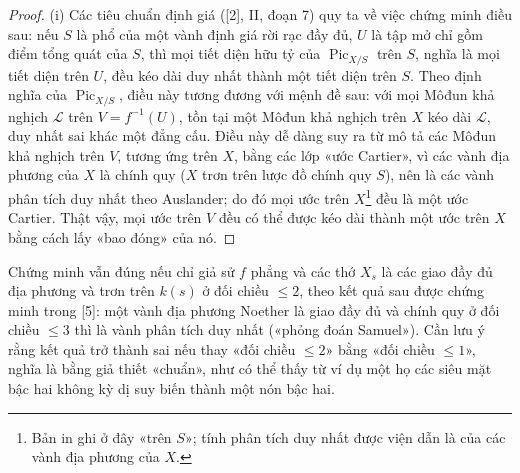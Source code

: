 \begin{proof}
(i) Các tiêu chuẩn định giá ([2], II, đoạn 7) quy ta về việc chứng minh điều
sau: nếu $S$ là phổ của một vành định giá rời rạc đầy đủ, $U$ là tập mở chỉ
gồm điểm tổng quát của $S$, thì mọi tiết diện hữu tỷ của
$\operatorname{Pic}_{X/S}$ trên $S$, nghĩa là mọi tiết diện trên $U$, đều kéo
dài duy nhất thành một tiết diện trên $S$. Theo định nghĩa của
$\operatorname{Pic}_{X/S}$, điều này tương đương với mệnh đề sau: với mọi
Môđun khả nghịch $\mathcal L$ trên $V=f^{-1}(U)$, tồn tại một Môđun khả nghịch
trên $X$ kéo dài $\mathcal L$, duy nhất sai khác một đẳng cấu. Điều này dễ dàng
suy ra từ mô tả các Môđun khả nghịch trên $V$, tương ứng trên $X$, bằng các
lớp «ước Cartier», vì các vành địa phương của $X$ là chính quy ($X$ trơn trên
lược đồ chính quy $S$), nên là các vành phân tích duy nhất theo Auslander; do
đó mọi ước trên $X$\footnote{Bản in ghi ở đây «trên $S$»; tính phân tích duy
nhất được viện dẫn là của các vành địa phương của $X$.} đều là một ước
Cartier. Thật vậy, mọi ước trên $V$ đều có thể được kéo dài thành một ước trên
$X$ bằng cách lấy «bao đóng» của nó.
\end{proof}

 Chứng minh vẫn đúng nếu chỉ giả sử $f$ phẳng và các thớ
$X_s$ là các giao đầy đủ địa phương và trơn trên $k(s)$ ở đối chiều $\leq2$,
theo kết quả sau được chứng minh trong [5]: một vành địa phương Noether là giao
đầy đủ và chính quy ở đối chiều $\leq3$ thì là vành phân tích duy nhất («phỏng
đoán Samuel»). Cần lưu ý rằng
kết quả trở thành sai nếu thay «đối chiều $\leq2$» bằng «đối chiều
$\leq1$», nghĩa là bằng giả thiết «chuẩn», như có thể thấy từ ví dụ một họ các
siêu mặt bậc hai không kỳ dị suy biến thành một nón bậc hai.

